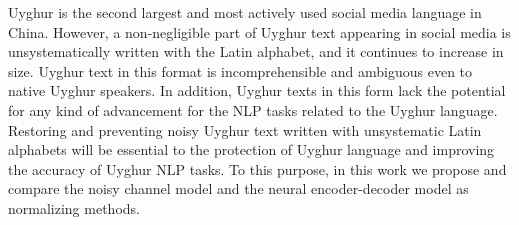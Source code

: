 Uyghur is the second largest and most actively used social media language in China. However, a non-negligible part of Uyghur text appearing in social media is unsystematically written with the Latin alphabet, and it continues to increase in size. Uyghur text in this format is incomprehensible and ambiguous even to native Uyghur speakers. In addition, Uyghur texts in this form lack the potential for any kind of advancement for the NLP tasks related to the Uyghur language. Restoring and preventing noisy Uyghur text written with unsystematic Latin alphabets will be essential to the protection of Uyghur language and improving the accuracy of Uyghur NLP tasks. To this purpose, in this work we propose and compare the noisy channel model and the neural encoder-decoder model as normalizing methods.
